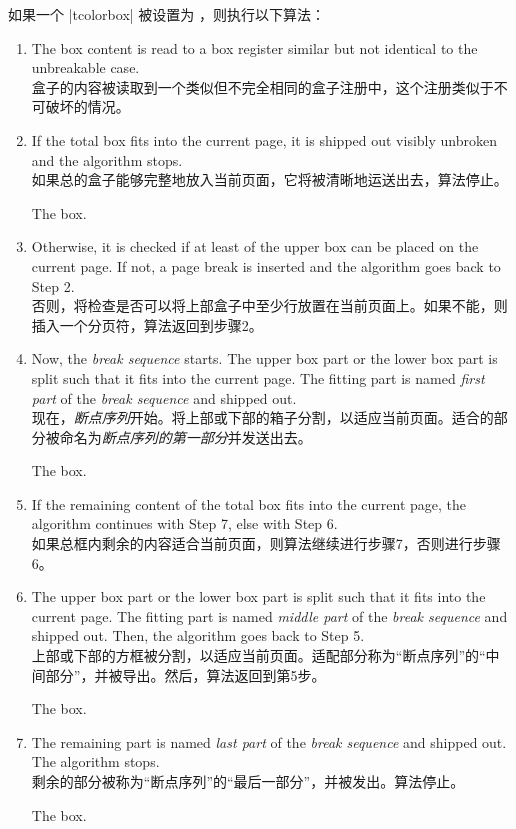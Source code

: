 {如果一个 |tcolorbox| 被设置为 ，则执行以下算法：
\begin{enumerate}
\item The box content is read to a box register similar but not identical
  to the unbreakable case.
\\盒子的内容被读取到一个类似但不完全相同的盒子注册中，这个注册类似于不可破坏的情况。
\item If the total box fits into the current page, it is shipped out visibly
  unbroken and the algorithm stops.
\\如果总的盒子能够完整地放入当前页面，它将被清晰地运送出去，算法停止。
  \begin{tcolorbox}[title=Unbroken Box,watermark text=unbroken]
  The box.
  \end{tcolorbox}
\item Otherwise, it is checked if at least 
  of the upper box can be placed on the current page.
  If not, a page break is inserted and the algorithm goes back to Step 2.
\\否则，将检查是否可以将上部盒子中至少行放置在当前页面上。如果不能，则插入一个分页符，算法返回到步骤2。
\item Now, the \emph{break sequence} starts.
  The upper box part or the lower box part is split such that it fits
  into the current page. The fitting part is named \emph{first part} of
  the \emph{break sequence} and shipped out.
\\现在，\emph{断点序列}开始。将上部或下部的箱子分割，以适应当前页面。适合的部分被命名为\emph{断点序列的第一部分}并发送出去。
  \begin{tcolorbox}[title=Broken Box,watermark text=first,skin=enhancedfirst]
  The box.
  \end{tcolorbox}
\item
  If the remaining content of the total box
  fits into the current page, the algorithm continues with Step 7, else
  with Step 6.
\\如果总框内剩余的内容适合当前页面，则算法继续进行步骤7，否则进行步骤6。
\item
  The upper box part or the lower box part is split such that it fits
  into the current page. The fitting part is named \emph{middle part} of
  the \emph{break sequence} and shipped out.
  Then, the algorithm goes back to Step 5.
\\上部或下部的方框被分割，以适应当前页面。适配部分称为“断点序列”的“中间部分”，并被导出。然后，算法返回到第5步。
  \begin{tcolorbox}[watermark text=middle,skin=enhancedmiddle]
  The box.
  \end{tcolorbox}
\item
  The remaining part is named \emph{last part} of
  the \emph{break sequence} and shipped out. The algorithm stops.
\\剩余的部分被称为“断点序列”的“最后一部分”，并被发出。算法停止。
  \begin{tcolorbox}[watermark text=last,skin=enhancedlast]
  The box.
  \end{tcolorbox}
\end{enumerate}
}

